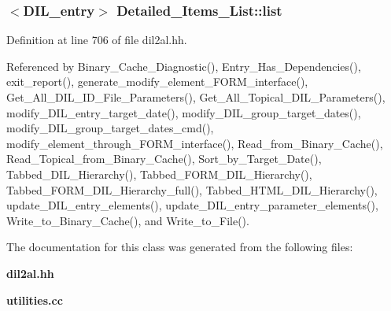 \subsubsection{$<${\bf DIL\_\-entry}$>$ Detailed\_\-Items\_\-List::list}\label{classDetailed__Items__List_m0}




Definition at line 706 of file dil2al.hh.

Referenced by Binary\_\-Cache\_\-Diagnostic(), Entry\_\-Has\_\-Dependencies(), exit\_\-report(), generate\_\-modify\_\-element\_\-FORM\_\-interface(), Get\_\-All\_\-DIL\_\-ID\_\-File\_\-Parameters(), Get\_\-All\_\-Topical\_\-DIL\_\-Parameters(), modify\_\-DIL\_\-entry\_\-target\_\-date(), modify\_\-DIL\_\-group\_\-target\_\-dates(), modify\_\-DIL\_\-group\_\-target\_\-dates\_\-cmd(), modify\_\-element\_\-through\_\-FORM\_\-interface(), Read\_\-from\_\-Binary\_\-Cache(), Read\_\-Topical\_\-from\_\-Binary\_\-Cache(), Sort\_\-by\_\-Target\_\-Date(), Tabbed\_\-DIL\_\-Hierarchy(), Tabbed\_\-FORM\_\-DIL\_\-Hierarchy(), Tabbed\_\-FORM\_\-DIL\_\-Hierarchy\_\-full(), Tabbed\_\-HTML\_\-DIL\_\-Hierarchy(), update\_\-DIL\_\-entry\_\-elements(), update\_\-DIL\_\-entry\_\-parameter\_\-elements(), Write\_\-to\_\-Binary\_\-Cache(), and Write\_\-to\_\-File().

The documentation for this class was generated from the following files:\begin{CompactItemize}
\item 
{\bf dil2al.hh}\item 
{\bf utilities.cc}\end{CompactItemize}
